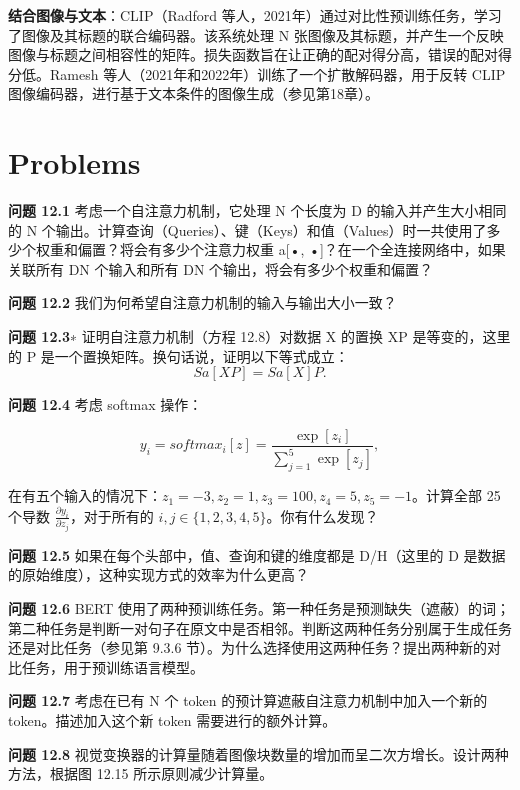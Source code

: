 \textbf{结合图像与文本}：CLIP（Radford 等人，2021年）通过对比性预训练任务，学习了图像及其标题的联合编码器。该系统处理 N 张图像及其标题，并产生一个反映图像与标题之间相容性的矩阵。损失函数旨在让正确的配对得分高，错误的配对得分低。Ramesh 等人（2021年和2022年）训练了一个扩散解码器，用于反转 CLIP 图像编码器，进行基于文本条件的图像生成（参见第18章）。


\section{Problems}
\textbf{问题 12.1} 考虑一个自注意力机制，它处理 N 个长度为 D 的输入并产生大小相同的 N 个输出。计算查询（Queries）、键（Keys）和值（Values）时一共使用了多少个权重和偏置？将会有多少个注意力权重 a[•, •]？在一个全连接网络中，如果关联所有 DN 个输入和所有 DN 个输出，将会有多少个权重和偏置？

\textbf{问题 12.2} 我们为何希望自注意力机制的输入与输出大小一致？

\textbf{问题 12.3}∗ 证明自注意力机制（方程 12.8）对数据 X 的置换 XP 是等变的，这里的 P 是一个置换矩阵。换句话说，证明以下等式成立：
\begin{equation}
Sa[XP] = Sa[X]P. 
\end{equation}

\textbf{问题 12.4} 考虑 softmax 操作：

\begin{equation}
y_i = softmax_i[z] = \frac{\exp[z_i]}{\sum_{j=1}^{5} \exp[z_j]}, 
\end{equation}

在有五个输入的情况下：\(z_1 = -3, z_2 = 1, z_3 = 100, z_4 = 5, z_5 = -1\)。计算全部 25 个导数 \(\frac{\partial y_i}{\partial z_j}\)，对于所有的 \(i,j \in \{1,2,3,4,5\}\)。你有什么发现？

\textbf{问题 12.5} 如果在每个头部中，值、查询和键的维度都是 D/H（这里的 D 是数据的原始维度），这种实现方式的效率为什么更高？

\textbf{问题 12.6} BERT 使用了两种预训练任务。第一种任务是预测缺失（遮蔽）的词；第二种任务是判断一对句子在原文中是否相邻。判断这两种任务分别属于生成任务还是对比任务（参见第 9.3.6 节）。为什么选择使用这两种任务？提出两种新的对比任务，用于预训练语言模型。

\textbf{问题 12.7} 考虑在已有 N 个 token 的预计算遮蔽自注意力机制中加入一个新的 token。描述加入这个新 token 需要进行的额外计算。

\textbf{问题 12.8} 视觉变换器的计算量随着图像块数量的增加而呈二次方增长。设计两种方法，根据图 12.15 所示原则减少计算量。

